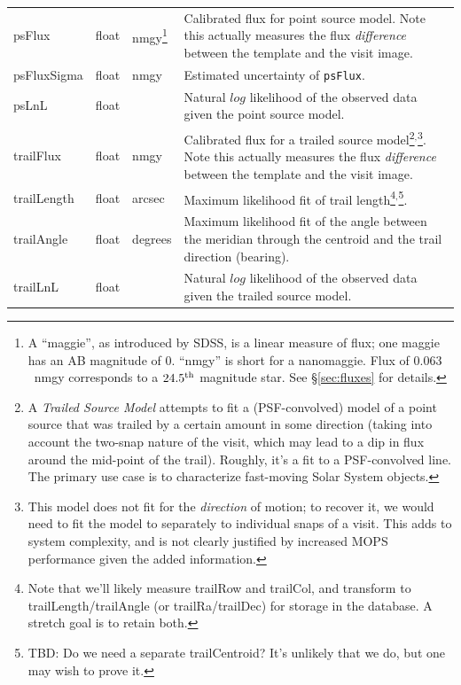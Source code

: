 \documentclass[12pt]{article}
\begin{document}
\begin{center}
\begin{longtable}{p{3cm}p{2cm}p{2cm}p{5cm}}
psFlux & float & nmgy\footnote{A ``maggie'', as introduced by SDSS, is a
linear measure of flux; one maggie has an AB magnitude of 0. ``nmgy'' is short
for a nanomaggie. Flux of $0.063$~nmgy corresponds to a $24.5^{\rm th}$
magnitude star. See \S \ref{sec:fluxes} for details.} & Calibrated flux for
point source model. Note this actually measures the flux {\em difference}
between the template and the visit image. \\ 

psFluxSigma & float & nmgy & Estimated uncertainty of \texttt{psFlux}. \\

psLnL & float & ~ & Natural $log$ likelihood of the observed data given the
point source model. \\ 

trailFlux & float & nmgy & Calibrated flux for a trailed source
model\footnote{A {\em Trailed Source Model} attempts to fit a (PSF-convolved)
model of a point source that was trailed by a certain amount in some direction
(taking into account the two-snap nature of the visit, which may lead to a dip
in flux around the mid-point of the trail). Roughly, it's a fit to a
PSF-convolved line. The primary use case is to characterize fast-moving Solar
System objects.}$^,$\footnote{This model does not fit for the {\em direction}
of motion; to recover it, we would need to fit the model to separately to
individual snaps of a visit. This adds to system complexity, and is not
clearly justified by increased MOPS performance given the added information.}.
Note this actually measures the flux {\em difference} between the template and
the visit image. \\ 

trailLength & float & arcsec & Maximum likelihood fit of trail
length\footnote{Note that we'll likely measure trailRow and trailCol, and
transform to trailLength/trailAngle (or trailRa/trailDec) for storage in the
database. A stretch goal is to retain both.}$^,$\footnote{TBD: Do we need a
separate trailCentroid? It's unlikely that we do, but one may wish to prove
it.}. \\ 

trailAngle & float & degrees & Maximum likelihood fit of the angle between the
meridian through the centroid and the trail direction (bearing). \\ 

trailLnL & float & ~ & Natural $log$ likelihood of the observed data given the
trailed source model. \\ 


\end{longtable}
\end{center}
\end{document}
